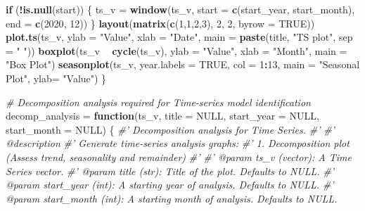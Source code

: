\documentclass[
  11pt,
]{article}
\newenvironment{Shaded}{\begin{snugshade}}{\end{snugshade}}
\newcommand{\CommentTok}[1]{\textcolor[rgb]{0.56,0.35,0.01}{\textit{#1}}}
\newcommand{\ControlFlowTok}[1]{\textcolor[rgb]{0.13,0.29,0.53}{\textbf{#1}}}
\newcommand{\DataTypeTok}[1]{\textcolor[rgb]{0.13,0.29,0.53}{#1}}
\newcommand{\DecValTok}[1]{\textcolor[rgb]{0.00,0.00,0.81}{#1}}
\newcommand{\KeywordTok}[1]{\textcolor[rgb]{0.13,0.29,0.53}{\textbf{#1}}}
\newcommand{\NormalTok}[1]{#1}
\newcommand{\OperatorTok}[1]{\textcolor[rgb]{0.81,0.36,0.00}{\textbf{#1}}}
\newcommand{\OtherTok}[1]{\textcolor[rgb]{0.56,0.35,0.01}{#1}}
\newcommand{\StringTok}[1]{\textcolor[rgb]{0.31,0.60,0.02}{#1}}
\begin{document}
\begin{Shaded}
\begin{Highlighting}[]
  \ControlFlowTok{if}\NormalTok{ (}\OperatorTok{!}\KeywordTok{is.null}\NormalTok{(start)) \{}
\NormalTok{    ts_v =}\StringTok{ }\KeywordTok{window}\NormalTok{(ts_v,}
                \DataTypeTok{start =} \KeywordTok{c}\NormalTok{(start_year, start_month),}
                \DataTypeTok{end =} \KeywordTok{c}\NormalTok{(}\DecValTok{2020}\NormalTok{, }\DecValTok{12}\NormalTok{))}
\NormalTok{  \}}
  \KeywordTok{layout}\NormalTok{(}\KeywordTok{matrix}\NormalTok{(}\KeywordTok{c}\NormalTok{(}\DecValTok{1}\NormalTok{,}\DecValTok{1}\NormalTok{,}\DecValTok{2}\NormalTok{,}\DecValTok{3}\NormalTok{), }\DecValTok{2}\NormalTok{, }\DecValTok{2}\NormalTok{, }\DataTypeTok{byrow =} \OtherTok{TRUE}\NormalTok{))}
  \KeywordTok{plot.ts}\NormalTok{(ts_v,}
          \DataTypeTok{ylab =} \StringTok{"Value"}\NormalTok{,}
          \DataTypeTok{xlab =} \StringTok{"Date"}\NormalTok{,}
          \DataTypeTok{main =} \KeywordTok{paste}\NormalTok{(title, }\StringTok{"TS plot"}\NormalTok{, }\DataTypeTok{sep =} \StringTok{" "}\NormalTok{))}
  \KeywordTok{boxplot}\NormalTok{(ts_v }\OperatorTok{~}\StringTok{ }\KeywordTok{cycle}\NormalTok{(ts_v),}
          \DataTypeTok{ylab =} \StringTok{"Value"}\NormalTok{,}
          \DataTypeTok{xlab =} \StringTok{"Month"}\NormalTok{,}
          \DataTypeTok{main =} \StringTok{"Box Plot"}\NormalTok{)}
  \KeywordTok{seasonplot}\NormalTok{(ts_v, }
             \DataTypeTok{year.labels =} \OtherTok{TRUE}\NormalTok{, }
             \DataTypeTok{col =} \DecValTok{1}\OperatorTok{:}\DecValTok{13}\NormalTok{,}
           \DataTypeTok{main =} \StringTok{"Seasonal Plot"}\NormalTok{, }
           \DataTypeTok{ylab=} \StringTok{"Value"}\NormalTok{)}
\NormalTok{\}}

\CommentTok{# Decomposition analysis required for Time-series model identification}
\NormalTok{decomp_analysis =}\StringTok{ }\ControlFlowTok{function}\NormalTok{(ts_v,}
                           \DataTypeTok{title =} \OtherTok{NULL}\NormalTok{,}
                           \DataTypeTok{start_year =} \OtherTok{NULL}\NormalTok{,}
                           \DataTypeTok{start_month =} \OtherTok{NULL}\NormalTok{) \{}
  \CommentTok{#' Decomposition analysis for Time Series.}
  \CommentTok{#' }
  \CommentTok{#' @description}
  \CommentTok{#' Generate time-series analysis graphs:}
  \CommentTok{#' 1. Decomposition plot (Assess trend, seasonality and remainder)}
  \CommentTok{#'}
  \CommentTok{#' @param ts_v (vector): A Time Series vector.}
  \CommentTok{#' @param title (str): Title of the plot. Defaults to NULL.}
  \CommentTok{#' @param start_year (int): A starting year of analysis. Defaults to NULL.}
  \CommentTok{#' @param start_month (int): A starting month of analysis. Defaults to NULL.}
  

\end{Highlighting}
\end{Shaded}
\end{document}
